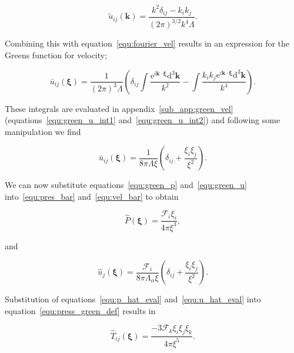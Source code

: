 \documentclass[12pt]{article}
\begin{document}
\begin{equation}
\label{equ:fourier_green_u}
\tilde{u}_{ij} (\boldsymbol{k}) = \frac{k^{2} \delta_{ij} - k_{i} k_{j}}{(2 \pi)^{3/2} k^{4} \Lambda} .
\end{equation}

Combining this with equation~\ref{equ:fourier_vel} results in an expression for the Greens function for velocity;

\begin{equation}
\label{equ:green_u_int}
\bar{u}_{ij} (\boldsymbol\xi) = \frac{1}{(2 \pi)^{3} \Lambda} \left(\delta_{ij} \int \frac{\mathrm{e}^{i \boldsymbol{k} \cdot \boldsymbol\xi} \mathrm{d}^{3} \boldsymbol{k}}{k^{2}} - \int \frac{k_{i} k_{j} \mathrm{e}^{i \boldsymbol{k} \cdot \boldsymbol\xi} \mathrm{d}^{3} \boldsymbol{k}}{k^{4}} \right).
\end{equation}

These integrals are evaluated in appendix~\ref{sub_app:green_vel} (equations~\ref{equ:green_u_int1} and~\ref{equ:green_u_int2}) and following some manipulation we find

\begin{equation}
\label{equ:green_u}
\bar{u}_{ij} (\boldsymbol\xi) = \frac{1}{8 \pi \Lambda \xi} \left(\delta_{ij} + \frac{\xi_{i} \xi_{j}}{\xi^{2}} \right).
\end{equation}

We can now substitute equations~\ref{equ:green_p} and~\ref{equ:green_u} into~\ref{equ:pres_bar} and~\ref{equ:vel_bar} to obtain

\begin{equation}
\label{equ:p_hat_eval}
\hat{P} (\boldsymbol\xi) = \frac{\mathcal{F}_{i} \xi_{i}}{4 \pi \xi^{3}},
\end{equation}

and 

\begin{equation}
\label{equ:u_hat_eval}
\hat{u}_{j}(\boldsymbol\xi) = \frac{\mathcal{F}_{i}}{8 \pi \Lambda_{\alpha} \xi} \left(\delta_{ij} + \frac{\xi_{i} \xi_{j}}{\xi^{2}} \right).
\end{equation}


Substitution of equations~\ref{equ:p_hat_eval} and~\ref{equ:u_hat_eval} into equation~\ref{equ:press_green_def} results in

\begin{equation}
\label{equ:green_stress}
\hat{T}_{ij} (\boldsymbol\xi) = \frac{-3 \mathcal{F}_{k} \xi_{i} \xi_{j} \xi_{k}}{4 \pi \xi^{5}}.
\end{equation}
\end{document}
